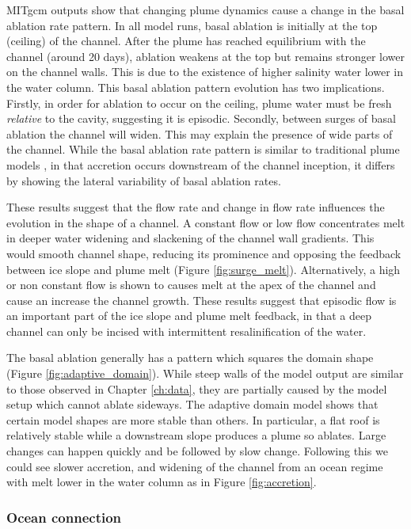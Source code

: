 MITgcm outputs show that changing plume dynamics cause a change in the basal ablation rate pattern. In all model runs, basal ablation is initially at the top (ceiling) of the channel. After the plume has reached equilibrium with the channel (around 20 days), ablation weakens at the top but remains stronger lower on the channel walls. This is due to the existence of higher salinity water lower in the water column. This basal ablation pattern evolution has two implications. Firstly, in order for ablation to occur on the ceiling, plume water must be fresh \textit{relative} to the cavity, suggesting it is episodic. Secondly, between surges of basal ablation the channel will widen. This may explain the presence of wide parts of the channel.
While the basal ablation rate pattern is similar to traditional plume models \citep[e.g.][]{jenkins2011convection}, in that accretion occurs downstream of the channel inception, it differs by showing the lateral variability of basal ablation rates. 

These results suggest that the flow rate and change in flow rate influences the evolution in the shape of a channel. A constant flow or low flow concentrates melt in deeper water widening and slackening of the channel wall gradients. This would smooth channel shape, reducing its prominence and opposing the feedback between ice slope and plume melt (Figure \ref{fig:surge_melt}). 
Alternatively, a high or non constant flow is shown to causes melt at the apex of the channel and cause an increase the channel growth. 
These results suggest that episodic flow is an important part of the ice slope and plume melt feedback, in that a deep channel can only be incised with intermittent resalinification of the water. 

The basal ablation generally has a pattern which squares the domain shape (Figure \ref{fig:adaptive_domain}). While steep walls of the model output are similar to those observed in Chapter \ref{ch:data}, they are partially caused by the model setup which cannot ablate sideways. The adaptive domain model shows that certain model shapes are more stable than others. In particular, a flat roof is relatively stable while a downstream slope produces a plume so ablates. Large changes can happen quickly and be followed by slow change.  Following this we could see slower accretion, and widening of the channel from an ocean regime with melt lower in the water column as in Figure \ref{fig:accretion}.

\subsubsection{Ocean connection}

